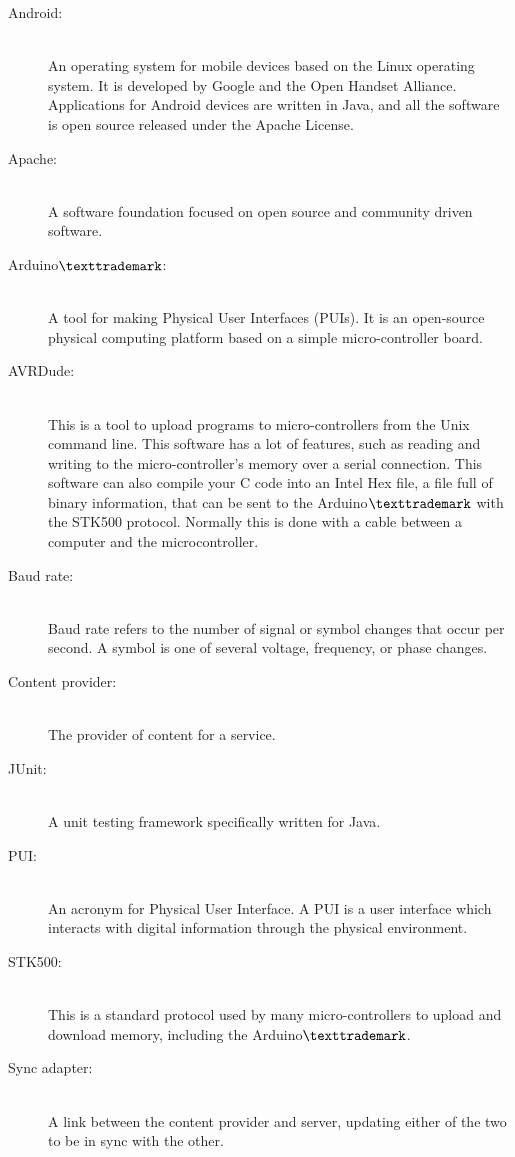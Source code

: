 \begin{description}
	\item[Android:]\hfill \\
		An operating system for mobile devices based on the Linux operating system. It is developed by Google and the Open Handset Alliance. Applications for Android devices are written in Java, and all the software is open source released under the Apache License.
	\item[Apache:] \hfill \\
		A software foundation focused on open source and community driven software.
	\item[Arduino$\texttrademark$:]\hfill \\
		A tool for making Physical User Interfaces (PUIs). It is an open-source physical computing platform based on a simple micro-controller board.
	\item[AVRDude:]\hfill \\
		This is a tool to upload programs to micro-controllers from the Unix command line. This software has a lot of features, such as reading and writing to the micro-controller's memory over a serial connection. This software can also compile your C code into an Intel Hex file, a file full of binary information, that can be sent to the Arduino$\texttrademark$ with the STK500 protocol. Normally this is done with a cable between a computer and the microcontroller.
	\item[Baud rate:]\hfill \\
		Baud rate refers to the number of signal or symbol changes that occur per second. A symbol is one of several voltage, frequency, or phase changes. \cite{baudrate}
	\item[Content provider:]\hfill \\
		The provider of content for a service. 
	\item[JUnit:]\hfill \\
		A unit testing framework specifically written for Java.
	\item[PUI:]\hfill \\
		An acronym for Physical User Interface. A PUI is a user interface which interacts with digital information through the physical environment.
	\item[STK500:]\hfill \\
		This is a standard protocol used by many micro-controllers to upload and download memory, including the Arduino$\texttrademark$.
	\item[Sync adapter:]\hfill \\
		A link between the content provider and server, updating either of the two to be in sync with the other.
\end{description}
